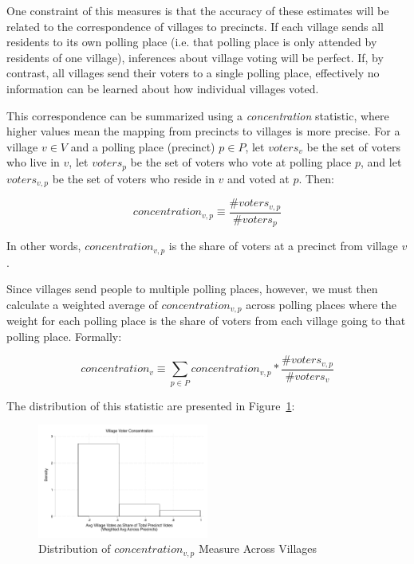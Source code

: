 \documentclass[12pt]{article}
\begin{document}
\begin{appendix}
One constraint of this measures is that the accuracy of these estimates will be related to the correspondence of villages to precincts. If each village sends all residents to its own polling place (i.e. that polling place is only attended by residents of one village), inferences about village voting will be perfect. If, by contrast, all villages send their voters to a single polling place, effectively no information can be learned about how individual villages voted.

This correspondence can be summarized using a \emph{concentration} statistic, where higher values mean the mapping from precincts to villages is more precise. For a village $v \in V$ and a polling place (precinct) $p \in P$, let $voters_{v}$ be the set of voters who live in $v$, let $voters_{p}$ be the set of voters who vote at polling place $p$, and let $voters_{v,p}$ be the set of voters who reside in $v$ and voted at $p$. Then:

\begin{equation}
 	concentration_{v,p} \equiv \frac{\#voters_{v,p}}{\#voters_{p}}
\end{equation}

In other words, $concentration_{v,p}$ is the share of voters at a precinct from village $v$.

Since villages send people to multiple polling places, however, we must then calculate a weighted average of $concentration_{v,p}$ across polling places where the weight for each polling place is the share of voters from each village going to that polling place. Formally:

\begin{equation}
	concentration_{v} \equiv \sum_{p \in P} concentration_{v,p} * \frac{\#voters_{v,p}} { \# voters_{v}}
\end{equation}

The distribution of this statistic are presented in Figure~\ref{village_concentration}:

\begin{figure}[bht]
	\begin{center}
	    \caption{Distribution of $concentration_{v,p}$ Measure Across Villages}\label{village_concentration}
    		\includegraphics[width=0.5\textwidth]{../3_results/concentration_hist.pdf}
    \end{center}
\end{figure}


\end{appendix}
\end{document}
